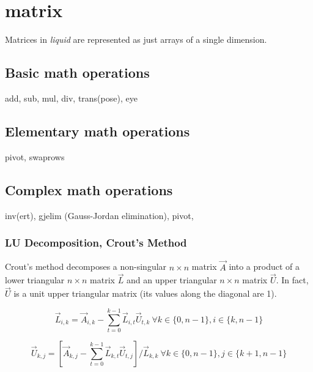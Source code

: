% 
%
\section{matrix}
\label{module:matrix}
Matrices in {\it liquid} are represented as just arrays of a single dimension.

\subsection{Basic math operations}
\label{module:matrix:math}
add, sub, mul, div, trans(pose), eye

\subsection{Elementary math operations}
\label{module:matrix:elementary}
pivot, swaprows

\subsection{Complex math operations}
\label{module:matrix:complex}
inv(ert), gjelim (Gauss-Jordan elimination), pivot,

\subsubsection{LU Decomposition, Crout's Method}
Crout's method decomposes a non-singular $n\times n$ matrix $\vec{A}$ into a
product of a lower triangular $n \times n$ matrix $\vec{L}$ and an upper
triangular $n \times n$ matrix $\vec{U}$. %
In fact, $\vec{U}$ is a unit upper triangular matrix (its values along the
diagonal are 1).

\[
    \vec{L}_{i,k} = \vec{A}_{i,k} -
                    \sum_{t=0}^{k-1}{ \vec{L}_{i,t} \vec{U}_{t,k} }
                    \ \forall k \in \{0,n-1\}, i \in \{k,n-1\}
\]

\[
    \vec{U}_{k,j} = \left[
                    \vec{A}_{k,j} -
                    \sum_{t=0}^{k-1}{ \vec{L}_{k,t} \vec{U}_{t,j} }
                    \right] / \vec{L}_{k,k}
                    \ \forall k \in \{0,n-1\}, j \in \{k+1,n-1\}
\]

